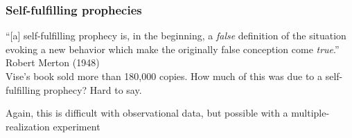 \documentclass[aspectratio=169]{beamer}
\begin{document}
\begin{frame}
\frametitle{Self-fulfilling prophecies}

``[a] self-fulfilling prophecy is, in the beginning, a {\em false}
definition of the situation evoking a new behavior which make the
originally false conception come {\em true}.'' Robert Merton (1948)\\

\vspace{0.3in}
Vise's book sold more than 180,000 copies.  How much of this was
due to a self-fulfilling prophecy?  Hard to say.

\vspace{0.3in} 
Again, this is difficult with observational data, but possible with a multiple-realization experiment

\end{frame}
\end{document}
